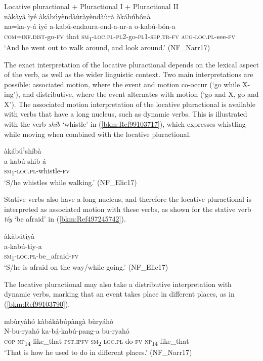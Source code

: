\ea
\label{bkm:Ref99103665}
Locative pluractional + Pluractional I + Pluractional II\\
nàkàyâ ìyé àkábúyèndàùràyèndàùrà òkábúbônà\\
\gll na=ka-y-á      iyé  a-kabú-endaura-end-a-ur-a    o-kabú-bón-a \\
\textsc{com}=\textsc{inf}.\textsc{dist}-go-\textsc{fv}  that
\textsc{sm}\textsubscript{1}-\textsc{loc}.\textsc{pl}-\textsc{pl}2-go-\textsc{pl}1-\textsc{sep}.\textsc{tr}-\textsc{fv}  \textsc{aug}-\textsc{loc}.\textsc{pl}-see-\textsc{fv}\\
\glt ‘And he went out to walk around, and look around.’ (NF\_Narr17)
\z

The exact interpretation of the locative pluractional depends on the lexical aspect of the verb, as well as the wider linguistic context. Two main interpretations are possible: associated motion, where the event and motion co-occur (‘go while X-ing’), and distributive, where the event alternates with motion (‘go and X, go and X’). The associated motion interpretation of the locative pluractional is available with verbs that have a long nucleus, such as dynamic verbs. This is illustrated with the verb \textit{shíb} ‘whistle’ in (\ref{bkm:Ref99103717}), which expresses whistling while moving when combined with the locative pluractional.

\ea
\label{bkm:Ref99103717}
\glll àkábúꜝshíbà\\
a-kabú-shib-á̲\\
\textsc{sm}\textsubscript{1}-\textsc{loc}.\textsc{pl}-whistle-\textsc{fv}\\
\glt ‘S/he whistles while walking.’ (NF\_Elic17)
\z

Stative verbs also have a long nucleus, and therefore the locative pluractional is interpreted as associated motion with these verbs, as shown for the stative verb \textit{tíy} ‘be afraid’ in (\ref{bkm:Ref497245742}).

\ea
\label{bkm:Ref497245742}
\glll àkàbútìyà\\
a-kabú-tiy-a\\
\textsc{sm}\textsubscript{1}-\textsc{loc}.\textsc{pl}-be\_afraid-\textsc{fv}\\
\glt ‘S/he is afraid on the way/while going.’ (NF\_Elic17)
\z

The locative pluractional may also take a distributive interpretation with dynamic verbs, marking that an event takes place in different places, as in (\ref{bkm:Ref99103790}).

\ea
\label{bkm:Ref99103790}
mbùryàhó kàbákàbúpàngà bùryáhò\\
\gll N-bu-ryahó    ka-bá̲-kabú-pang-a      bu-ryahó\\
\textsc{cop}-\textsc{np}\textsubscript{14}-like\_that  \textsc{pst}.\textsc{ipfv}-\textsc{sm}\textsubscript{2}-\textsc{loc}.\textsc{pl}-do-\textsc{fv}  \textsc{np}\textsubscript{14}-like\_that\\
\glt ‘That is how he used to do in different places.’ (NF\_Narr17)
\z

